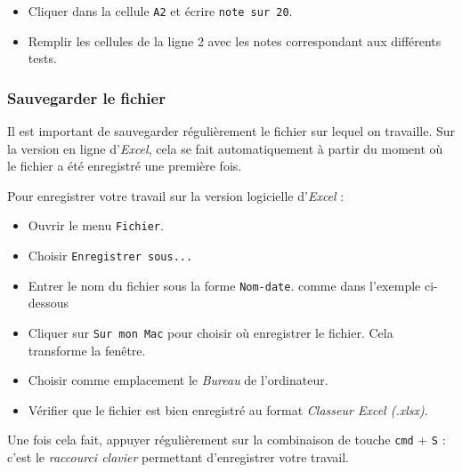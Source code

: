 \begin{itemize}
\item Cliquer dans la cellule \texttt{A2} et écrire \texttt{note sur 20}.
\item Remplir les cellules de la ligne 2 avec les notes correspondant aux différents tests.
\end{itemize}





\subsubsection{Sauvegarder le fichier}
\label{ssec_sauvegarder_fichier}
Il est important de sauvegarder régulièrement le fichier sur lequel on travaille. Sur la version en ligne d'\emph{Excel}, cela se fait automatiquement à partir du moment où le fichier a été enregistré une première fois.


Pour enregistrer votre travail sur la version logicielle d'\emph{Excel} :
\begin{itemize}
\item Ouvrir le menu \texttt{Fichier}.
\item Choisir \texttt{Enregistrer sous...}
\item Entrer le nom du fichier sous la forme \texttt{Nom-date}.  comme dans l'exemple ci-dessous
\item Cliquer sur \texttt{Sur mon Mac} pour choisir où enregistrer le fichier. Cela transforme la fenêtre. 
\item Choisir comme emplacement le \emph{Bureau} de l'ordinateur. 
\item Vérifier que le fichier est bien enregistré au format \emph{Classeur Excel (.xlsx)}. 
\end{itemize}



Une fois cela fait, appuyer régulièrement sur la combinaison de touche \texttt{cmd} + \texttt{S} : c'est le \emph{raccourci clavier} permettant d'enregistrer votre travail.





